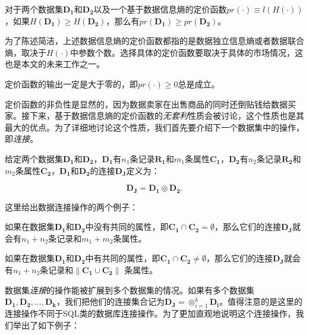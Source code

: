 \begin{exmp}
对于两个数据集$\bm{D_1}$和$\bm{D_2}$以及一个基于数据信息熵的定价函数$pr(\cdot) \equiv l(H(\cdot))$，如果$H(\bm{D_1})\ge H(\bm{D_2})$，那么有$pr(\bm{D_1})\ge pr(\bm{D_2})$。
\end{exmp}

为了陈述简洁，上述数据信息熵的定价函数都指的是数据独立信息熵或者数据联合熵，取决于$H(\cdot)$中参数个数。选择具体的定价函数要取决于具体的市场情况，这也是本文的未来工作之一。

\begin{propt}[定价函数的非负性]
定价函数的输出一定是大于零的，即$pr(\cdot) \ge 0$总是成立。
\label{pr:pricing_function_pr_1}
\end{propt}

定价函数的非负性是显然的，因为数据卖家在出售商品的同时还倒贴钱给数据买家。接下来，基于数据信息熵的定价函数的\textit{无套利}性质会被讨论，这个性质也是其最大的优点。为了详细地讨论这个性质，我们首先要介绍下一个数据集中的操作，即\textit{连接}。

\begin{defn}[数据集连接]

给定两个数据集$\bm{D_1}$和$\bm{D_2}$，$\bm{D_1}$有$n_1$条记录$\bm{R_1}$和$m_1$条属性$\bm{C_1}$，$\bm{D_2}$有$n_2$条记录$\bm{R_2}$和$m_2$条属性$\bm{C_2}$，$\bm{D_1}$和$\bm{D_2}$的连接$\bm{D_J}$定义为：

\begin{equation}
\bm{D_J}=\bm{D_1} \circledcirc \bm{D_2}.
\end{equation}
\end{defn}

这里给出数据连接操作的两个例子：

\begin{case}
如果在数据集$\bm{D_1}$和$\bm{D_2}$中没有共同的属性，即$\bm{C_1} \cap \bm{C_2} = \emptyset$，那么它们的连接$\bm{D_J}$就会有$n_1+n_2$条记录和$m_1+m_2$条属性。

\end{case}

\begin{case}
如果在数据集$\bm{D_1}$和$\bm{D_2}$中有共同的属性，即$\bm{C_1} \cap \bm{C_2} \ne \emptyset$，那么它们的连接$\bm{D_J}$就会有$n_1+n_2$条记录和$\|\bm{C_1} \cup \bm{C_2}\|$ 条属性。

\end{case}

数据集\textit{连接}的操作能被扩展到多个数据集的情况。如果有多个数据集 $\bm{D_1,D_2,...,D_k}$，我们把他们的连接集合记为$\bm{D_J}=\circledcirc_{i=1}^k \bm{D_i}$。值得注意的是这里的连接操作不同于SQL类的数据库连接操作。为了更加直观地说明这个连接操作，我们举出了如下例子：


